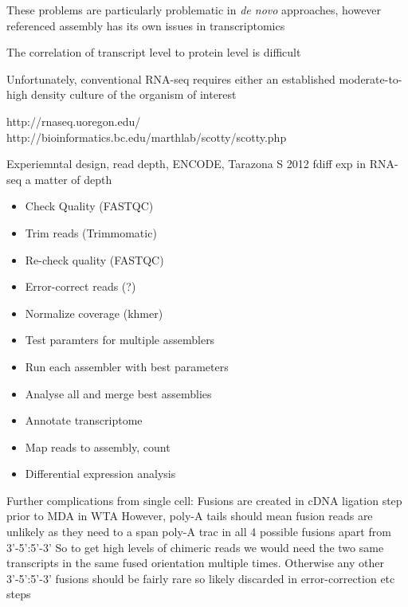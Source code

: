 These problems are particularly problematic in \textit{de novo} approaches,
however referenced assembly has its own issues in transcriptomics






The correlation of transcript level to protein level is difficult





Unfortunately, conventional RNA-seq requires either an established moderate-to-high
density culture of the organism of interest 








http://rnaseq.uoregon.edu/
http://bioinformatics.bc.edu/marthlab/scotty/scotty.php

Experiemntal design, read depth, ENCODE, Tarazona S 2012 fdiff exp in RNA-seq
a matter of depth

\begin{itemize}
    \item Check Quality (FASTQC)
    \item Trim reads (Trimmomatic)
    \item Re-check quality (FASTQC)
    \item Error-correct reads (?)
    \item Normalize coverage (khmer)
    \item Test paramters for multiple assemblers
    \item Run each assembler with best parameters
    \item Analyse all and merge best assemblies
    \item Annotate transcriptome
    \item Map reads to assembly, count
    \item Differential expression analysis
\end{itemize}










Further complications from single cell:
Fusions are created in cDNA ligation step prior to MDA in WTA
However, poly-A tails should mean fusion reads are unlikely as they need to a
span poly-A trac in all 4 possible fusions apart from 3'-5':5'-3'
So to get high levels of chimeric reads we would need the two same transcripts
in the same fused orientation multiple times.  Otherwise any other 3'-5':5'-3'
fusions should be fairly rare so likely discarded in error-correction etc steps

